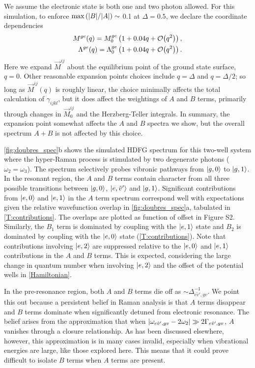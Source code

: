 \documentclass[aip, jcp, reprint, onecolumn, nofootinbib]{revtex4-2}
\begin{document}
We assume the electronic state is both one and two photon allowed.
For this simulation, to enforce $\max \left(\abs{B}/\abs{A}\right) \sim$ 0.1 at $\Delta = 0.5$, we declare the coordinate dependencies
\begin{eqnarray}
	M^{ge}(q) = M^{ge}_0 \left(1 + 0.04 q + \order{q^2}\right),  \\
	\Lambda^{ge}(q) = \Lambda^{ge}_0 \left(1 + 0.04 q + \order{q^2}\right).
\end{eqnarray}
Here we expand $\vec{M}^{ij}$ about the equilibrium point of the ground state surface, $q = 0$.
Other reasonable expansion points choices include $q=\Delta$ and $q=\Delta/2$;\cite{Kundu2022}
so long as $\vec{M}^{ij}(q)$ is roughly linear, the choice minimally affects the total calculation of $\gamma_{ijkl}$, but it does affect the weightings of $A$ and $B$ terms, primarily through changes in $\vec{M}_0^{ij}$ and the Herzberg-Teller integrals.
In summary, the expansion point somewhat affects the $A$ and $B$ spectra we show, but the overall spectrum $A+B$ is not affected by this choice.

\autoref{fig:doubres_spec}b shows the simulated HDFG spectrum for this two-well system where the hyper-Raman process is stimulated by two degenerate photons ($\omega_2 = \omega_3$). 
The spectrum selectively probes vibronic pathways from $\ket{g,0}$ to $\ket{g,1}$.
In the resonant region, the $A$ and $B$ terms contain character from all three possible transitions between $\ket{g,0}$, $\ket{e,\tilde{v}'}$ and $\ket{g,1}$. 
Significant contributions from $\ket{e,0}$ and $\ket{e,1}$ in the $A$ term spectrum correspond well with expectations given the relative wavefunction overlap in \autoref{fig:doubres_spec}a, tabulated in \autoref{T:contributions}. 
The overlaps are plotted as function of offset in Figure S2.
Similarly, the $B_1$ term is dominated by coupling with the $\ket{e,1}$ state and $B_2$ is dominated by coupling with the $\ket{e,0}$ state (\autoref{T:contributions}). 
Note that contributions involving $\ket{e,2}$ are suppressed relative to the $\ket{e,0}$ and $\ket{e,1}$ contributions in the $A$ and $B$ terms.
This is expected, considering the large change in quantum number when involving $\ket{e,2}$ and the offset of the potential wells in \autoref{Hamiltonian}.

In the pre-resonance region, both $A$ and $B$ terms die off as $\sim \Delta_{e\tilde{v}',gv}^{-1}$.
We point this out because a persistent belief in Raman analysis is that $A$ terms disappear and $B$ terms dominate when significantly detuned from electronic resonance.
The belief arises from the approximation that when $\abs{\omega_{e\tilde{v}',gv} - 2\omega_2} \gg 2\Gamma_{e\tilde{v}',gv}$, $A$ vanishes through a closure relationship.\cite{Neddersen1989}
As has been discussed elsewhere, however, this approximation is in many cases invalid, especially when vibrational energies are large, like those explored here.\cite{Warshel1977, Myers1982, Li1990, Gong2015}
This means that it could prove difficult to isolate $B$ terms when $A$ terms are present.
\end{document}
